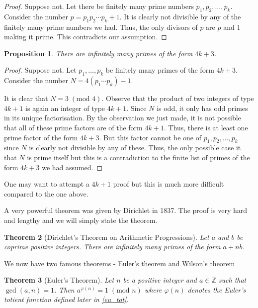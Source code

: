 \documentclass[10pt,openany]{book}
\newtheorem{theorem}{Theorem}[chapter]
\newtheorem{proposition}[theorem]{Proposition}
\theoremstyle{italicnonumber}
\theoremstyle{definition}
\newcommand{\Z}{\mathbb{Z}}
\begin{document}
\begin{proof}
  Suppose not. Let there be finitely many prime numbers $p_1, p_2, \dots, p_k$. Consider the number $p = p_1p_2\cdots p_k + 1$. It is clearly not divisible by any of the finitely many prime numbers we had. Thus, the only divisors of $p$ are $p$ and $1$ making it prime. This contradicts our assumption.
\end{proof}

\begin{proposition}
  There are infinitely many primes of the form $4k+3$.
\end{proposition}

\begin{proof}
  Suppose not. Let $p_1,\dots,p_k$ be finitely many primes of the form $4k+3$. Consider the number $N = 4 \left( p_1 \cdots p_k \right)-1$.

  It is clear that $N = 3 \; (\text{mod } 4)$. Observe that the product of two integers of type $4k+1$ is again an integer of type $4k+1$. Since $N$ is odd, it only has odd primes in its unique factorisation. By the observation we just made, it is not possible that all of these prime factors are of the form $4k+1$. Thus, there is at least one prime factor of the form $4k+3$. But this factor cannot be one of $p_1,p_2,\dots,p_k$ since $N$ is clearly not divisible by any of these. Thus, the only possible case it that $N$ is prime itself but this is a contradiction to the finite list of primes of the form $4k+3$ we had assumed.
\end{proof}

One may want to attempt a $4k+1$ proof but this is much more difficult compared to the one above.

A very powerful theorem was given by Dirichlet in 1837. The proof is very hard and lengthy and we will simply state the theorem.

\begin{theorem} [Dirichlet's Theorem on Arithmetic Progressions]
  Let $a$ and $b$ be coprime positive integers. There are infinitely many primes of the form $a+nb$.
\end{theorem}

We now have two famous theorems - Euler's theorem and Wilson's theorem

\begin{theorem} [Euler's Theorem] \label{eul_theo}
  Let $n$ be a positive integer and $a \in \Z$ such that $\gcd(a,n)=1$. Then $a^{\varphi(n)} = 1 \; (\text{mod } n)$ where $\varphi(n)$ denotes the Euler's totient function defined later in \cref{eu_tot}.
\end{theorem}
\end{document}
